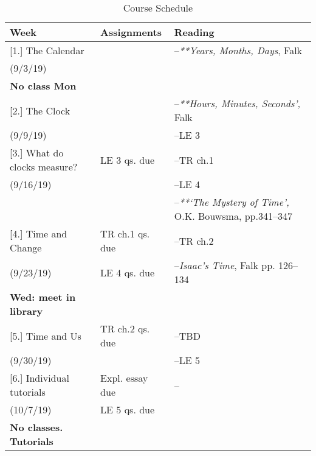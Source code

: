 \documentclass[article,oneside]{memoir}
\begin{document}
\begin{center}
\begin{longtable}{p{4.5cm}p{2.5cm}p{5cm}}
 
  \caption{Course Schedule} \\
  \toprule
  \textbf{Week} &\textbf{Assignments} & \textbf{Reading} \\
  \midrule



[1.] The Calendar		& 	& --\emph{**Years, Months, Days}, Falk \\
(9/3/19)			        	& 	&   \\
\textbf{No class Mon}	& 	&	\\[1.8\baselineskip]


[2.] The Clock   	&   	  	&  	--\emph{**Hours, Minutes, Seconds',} Falk  \\
(9/9/19)		 &		&   --LE 3 \\ [1.8\baselineskip]



[3.] What do clocks measure?	& LE 3 qs. due	& --TR ch.1\\
(9/16/19)				        	& 	& --LE 4\\ 
				        		& 	& --\emph{**`The Mystery of Time',} O.K. Bouwsma, pp.341--347 \\ [1.8\baselineskip]

[4.] Time and Change	 	&   TR ch.1 qs. due	& --TR ch.2\\
(9/23/19)				  	 &  LE 4 qs. due	& --\emph{Isaac's Time}, Falk pp. 126--134 \\ 
\textbf{Wed: meet in library} &  & \\  [1.8\baselineskip]

[5.] Time and Us 	&  TR ch.2 qs. due 	& --TBD\\
(9/30/19)			      		& 	& --LE 5 \\ [1.8\baselineskip]




[6.] Individual tutorials  	& Expl. essay due	& --\\
(10/7/19)			      	& LE 5 qs. due				&  \\ 
\textbf{No classes. Tutorials} &  & \\  [1.8\baselineskip]


\end{longtable}
\end{center}
\end{document}
